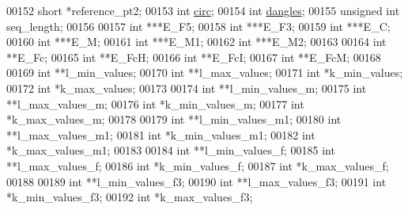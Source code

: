 \begin{DoxyCode}
00152   \textcolor{keywordtype}{short}                 *reference\_pt2;
00153   \textcolor{keywordtype}{int}                   \hyperlink{group__model__details_gaf9202a1a09f5828dc731e2d9a10fa111}{circ};
00154   \textcolor{keywordtype}{int}                   \hyperlink{group__model__details_ga72b511ed1201f7e23ec437e468790d74}{dangles};
00155   \textcolor{keywordtype}{unsigned} \textcolor{keywordtype}{int}          seq\_length;
00156 
00157   \textcolor{keywordtype}{int}                   ***E\_F5;
00158   \textcolor{keywordtype}{int}                   ***E\_F3;
00159   \textcolor{keywordtype}{int}                   ***E\_C;
00160   \textcolor{keywordtype}{int}                   ***E\_M;
00161   \textcolor{keywordtype}{int}                   ***E\_M1;
00162   \textcolor{keywordtype}{int}                   ***E\_M2;
00163 
00164   \textcolor{keywordtype}{int}                   **E\_Fc;
00165   \textcolor{keywordtype}{int}                   **E\_FcH;
00166   \textcolor{keywordtype}{int}                   **E\_FcI;
00167   \textcolor{keywordtype}{int}                   **E\_FcM;
00168 
00169   \textcolor{keywordtype}{int}                   **l\_min\_values;
00170   \textcolor{keywordtype}{int}                   **l\_max\_values;
00171   \textcolor{keywordtype}{int}                   *k\_min\_values;
00172   \textcolor{keywordtype}{int}                   *k\_max\_values;
00173 
00174   \textcolor{keywordtype}{int}                   **l\_min\_values\_m;
00175   \textcolor{keywordtype}{int}                   **l\_max\_values\_m;
00176   \textcolor{keywordtype}{int}                   *k\_min\_values\_m;
00177   \textcolor{keywordtype}{int}                   *k\_max\_values\_m;
00178 
00179   \textcolor{keywordtype}{int}                   **l\_min\_values\_m1;
00180   \textcolor{keywordtype}{int}                   **l\_max\_values\_m1;
00181   \textcolor{keywordtype}{int}                   *k\_min\_values\_m1;
00182   \textcolor{keywordtype}{int}                   *k\_max\_values\_m1;
00183 
00184   \textcolor{keywordtype}{int}                   **l\_min\_values\_f;
00185   \textcolor{keywordtype}{int}                   **l\_max\_values\_f;
00186   \textcolor{keywordtype}{int}                   *k\_min\_values\_f;
00187   \textcolor{keywordtype}{int}                   *k\_max\_values\_f;
00188 
00189   \textcolor{keywordtype}{int}                   **l\_min\_values\_f3;
00190   \textcolor{keywordtype}{int}                   **l\_max\_values\_f3;
00191   \textcolor{keywordtype}{int}                   *k\_min\_values\_f3;
00192   \textcolor{keywordtype}{int}                   *k\_max\_values\_f3;

\end{DoxyCode}
